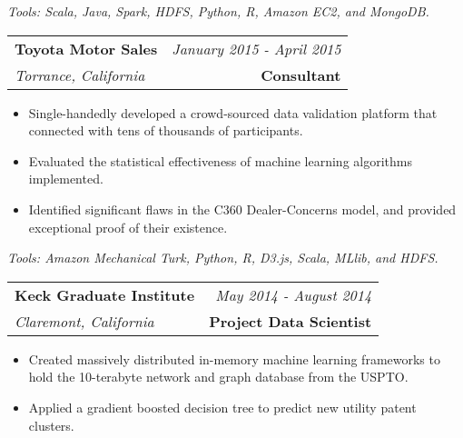 \documentclass[10pt,a4paper]{article}
\begin{document}
  \vspace*{2mm}\setlength\parindent{2mm}\begin{minipage}{16.8cm}
    \textit{Tools: Scala, Java, Spark, HDFS, Python, R, Amazon EC2, and MongoDB.}
  \end{minipage}

  \vspace*{3mm}\noindent\begin{tabularx}{17cm}{X r}
    \textbf{Toyota Motor Sales} & \textit{January 2015 - April 2015} \\
    \textit{Torrance, California} & \textbf{Consultant} 
  \end{tabularx}

  \vspace*{1mm}\noindent\begin{minipage}{17cm}
    \begin{itemize}[leftmargin=6mm,topsep=0mm,itemsep=-1mm]
      \item Single-handedly developed a crowd-sourced data validation platform that connected with tens of thousands of participants. 
      \item Evaluated the statistical effectiveness of machine learning algorithms implemented.
      \item Identified significant flaws in the C360 Dealer-Concerns model, and provided exceptional proof of their existence.
    \end{itemize}
  \end{minipage}

  \vspace*{2mm}\setlength\parindent{2mm}\begin{minipage}{16.8cm}
    \textit{Tools: Amazon Mechanical Turk, Python, R, D3.js, Scala, MLlib, and HDFS.}
  \end{minipage}

  \vspace*{3mm}\noindent\begin{tabularx}{17cm}{X r}
    \textbf{Keck Graduate Institute} & \textit{May 2014 - August 2014} \\
    \textit{Claremont, California} & \textbf{Project Data Scientist} 
  \end{tabularx}

  \vspace*{1mm}\noindent\begin{minipage}{17cm}
    \begin{itemize}[leftmargin=6mm,topsep=0mm,itemsep=-1mm]
      \item Created massively distributed in-memory machine learning frameworks to hold the 10-terabyte network and graph database from the USPTO.
      \item Applied a gradient boosted decision tree to predict new utility patent clusters.
    \end{itemize}
  \end{minipage}
\end{document}
